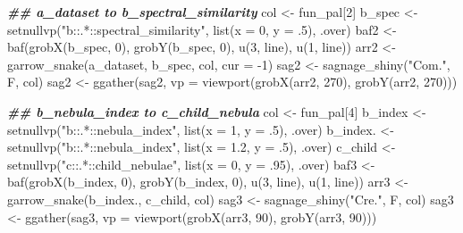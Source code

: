 \documentclass[
]{article}
\newenvironment{Shaded}{\begin{snugshade}}{\end{snugshade}}
\newcommand{\AttributeTok}[1]{\textcolor[rgb]{0.77,0.63,0.00}{#1}}
\newcommand{\DecValTok}[1]{\textcolor[rgb]{0.00,0.00,0.81}{#1}}
\newcommand{\DocumentationTok}[1]{\textcolor[rgb]{0.56,0.35,0.01}{\textbf{\textit{#1}}}}
\newcommand{\FloatTok}[1]{\textcolor[rgb]{0.00,0.00,0.81}{#1}}
\newcommand{\FunctionTok}[1]{\textcolor[rgb]{0.00,0.00,0.00}{#1}}
\newcommand{\NormalTok}[1]{#1}
\newcommand{\OtherTok}[1]{\textcolor[rgb]{0.56,0.35,0.01}{#1}}
\newcommand{\SpecialCharTok}[1]{\textcolor[rgb]{0.00,0.00,0.00}{#1}}
\newcommand{\StringTok}[1]{\textcolor[rgb]{0.31,0.60,0.02}{#1}}
\begin{document}
\begin{Shaded}
\begin{Highlighting}[]
\DocumentationTok{\#\# a\_dataset to b\_spectral\_similarity}
\NormalTok{col }\OtherTok{\textless{}{-}}\NormalTok{ fun\_pal[}\DecValTok{2}\NormalTok{]}
\NormalTok{b\_spec }\OtherTok{\textless{}{-}} \FunctionTok{setnullvp}\NormalTok{(}\StringTok{"b::.*::spectral\_similarity"}\NormalTok{, }\FunctionTok{list}\NormalTok{(}\AttributeTok{x =} \DecValTok{0}\NormalTok{, }\AttributeTok{y =}\NormalTok{ .}\DecValTok{5}\NormalTok{), .over)}
\NormalTok{baf2 }\OtherTok{\textless{}{-}} \FunctionTok{baf}\NormalTok{(}\FunctionTok{grobX}\NormalTok{(b\_spec, }\DecValTok{0}\NormalTok{), }\FunctionTok{grobY}\NormalTok{(b\_spec, }\DecValTok{0}\NormalTok{), }\FunctionTok{u}\NormalTok{(}\DecValTok{3}\NormalTok{, line), }\FunctionTok{u}\NormalTok{(}\DecValTok{1}\NormalTok{, line))}
\NormalTok{arr2 }\OtherTok{\textless{}{-}} \FunctionTok{garrow\_snake}\NormalTok{(a\_dataset, b\_spec, col, }\AttributeTok{cur =} \SpecialCharTok{{-}}\DecValTok{1}\NormalTok{)}
\NormalTok{sag2 }\OtherTok{\textless{}{-}} \FunctionTok{sagnage\_shiny}\NormalTok{(}\StringTok{"Com."}\NormalTok{, F, col)}
\NormalTok{sag2 }\OtherTok{\textless{}{-}} \FunctionTok{ggather}\NormalTok{(sag2, }\AttributeTok{vp =} \FunctionTok{viewport}\NormalTok{(}\FunctionTok{grobX}\NormalTok{(arr2, }\DecValTok{270}\NormalTok{), }\FunctionTok{grobY}\NormalTok{(arr2, }\DecValTok{270}\NormalTok{)))}

\DocumentationTok{\#\# b\_nebula\_index to c\_child\_nebula}
\NormalTok{col }\OtherTok{\textless{}{-}}\NormalTok{ fun\_pal[}\DecValTok{4}\NormalTok{]}
\NormalTok{b\_index }\OtherTok{\textless{}{-}} \FunctionTok{setnullvp}\NormalTok{(}\StringTok{"b::.*::nebula\_index"}\NormalTok{, }\FunctionTok{list}\NormalTok{(}\AttributeTok{x =} \DecValTok{1}\NormalTok{, }\AttributeTok{y =}\NormalTok{ .}\DecValTok{5}\NormalTok{), .over)}
\NormalTok{b\_index. }\OtherTok{\textless{}{-}} \FunctionTok{setnullvp}\NormalTok{(}\StringTok{"b::.*::nebula\_index"}\NormalTok{, }\FunctionTok{list}\NormalTok{(}\AttributeTok{x =} \FloatTok{1.2}\NormalTok{, }\AttributeTok{y =}\NormalTok{ .}\DecValTok{5}\NormalTok{), .over)}
\NormalTok{c\_child }\OtherTok{\textless{}{-}} \FunctionTok{setnullvp}\NormalTok{(}\StringTok{"c::.*::child\_nebulae"}\NormalTok{, }\FunctionTok{list}\NormalTok{(}\AttributeTok{x =} \DecValTok{0}\NormalTok{, }\AttributeTok{y =}\NormalTok{ .}\DecValTok{95}\NormalTok{), .over)}
\NormalTok{baf3 }\OtherTok{\textless{}{-}} \FunctionTok{baf}\NormalTok{(}\FunctionTok{grobX}\NormalTok{(b\_index, }\DecValTok{0}\NormalTok{), }\FunctionTok{grobY}\NormalTok{(b\_index, }\DecValTok{0}\NormalTok{), }\FunctionTok{u}\NormalTok{(}\DecValTok{3}\NormalTok{, line), }\FunctionTok{u}\NormalTok{(}\DecValTok{1}\NormalTok{, line))}
\NormalTok{arr3 }\OtherTok{\textless{}{-}} \FunctionTok{garrow\_snake}\NormalTok{(b\_index., c\_child, col)}
\NormalTok{sag3 }\OtherTok{\textless{}{-}} \FunctionTok{sagnage\_shiny}\NormalTok{(}\StringTok{"Cre."}\NormalTok{, F, col)}
\NormalTok{sag3 }\OtherTok{\textless{}{-}} \FunctionTok{ggather}\NormalTok{(sag3, }\AttributeTok{vp =} \FunctionTok{viewport}\NormalTok{(}\FunctionTok{grobX}\NormalTok{(arr3, }\DecValTok{90}\NormalTok{), }\FunctionTok{grobY}\NormalTok{(arr3, }\DecValTok{90}\NormalTok{)))}


\end{Highlighting}
\end{Shaded}
\end{document}
